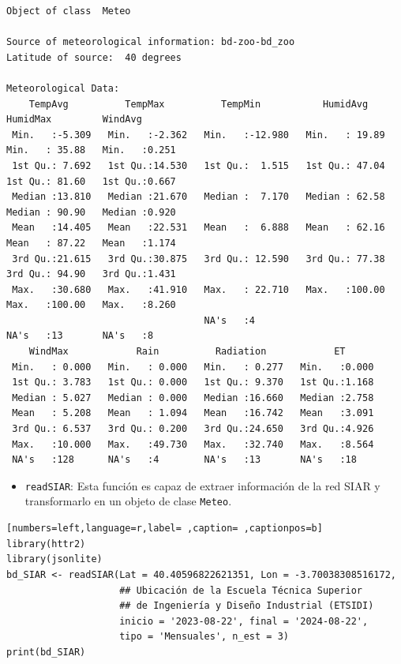 \begin{verbatim}
Object of class  Meteo 

Source of meteorological information: bd-zoo-bd_zoo 
Latitude of source:  40 degrees

Meteorological Data:
    TempAvg          TempMax          TempMin           HumidAvg         HumidMax         WindAvg     
 Min.   :-5.309   Min.   :-2.362   Min.   :-12.980   Min.   : 19.89   Min.   : 35.88   Min.   :0.251  
 1st Qu.: 7.692   1st Qu.:14.530   1st Qu.:  1.515   1st Qu.: 47.04   1st Qu.: 81.60   1st Qu.:0.667  
 Median :13.810   Median :21.670   Median :  7.170   Median : 62.58   Median : 90.90   Median :0.920  
 Mean   :14.405   Mean   :22.531   Mean   :  6.888   Mean   : 62.16   Mean   : 87.22   Mean   :1.174  
 3rd Qu.:21.615   3rd Qu.:30.875   3rd Qu.: 12.590   3rd Qu.: 77.38   3rd Qu.: 94.90   3rd Qu.:1.431  
 Max.   :30.680   Max.   :41.910   Max.   : 22.710   Max.   :100.00   Max.   :100.00   Max.   :8.260  
                                   NA's   :4                          NA's   :13       NA's   :8      
    WindMax            Rain          Radiation            ET       
 Min.   : 0.000   Min.   : 0.000   Min.   : 0.277   Min.   :0.000  
 1st Qu.: 3.783   1st Qu.: 0.000   1st Qu.: 9.370   1st Qu.:1.168  
 Median : 5.027   Median : 0.000   Median :16.660   Median :2.758  
 Mean   : 5.208   Mean   : 1.094   Mean   :16.742   Mean   :3.091  
 3rd Qu.: 6.537   3rd Qu.: 0.200   3rd Qu.:24.650   3rd Qu.:4.926  
 Max.   :10.000   Max.   :49.730   Max.   :32.740   Max.   :8.564  
 NA's   :128      NA's   :4        NA's   :13       NA's   :18
\end{verbatim}

\begin{itemize}
\item \texttt{readSIAR}: Esta función es capaz de extraer información de la red SIAR y transformarlo en un objeto de clase \texttt{Meteo}.
\end{itemize}
\begin{lstlisting}[numbers=left,language=r,label= ,caption= ,captionpos=b]
library(httr2)
library(jsonlite)
bd_SIAR <- readSIAR(Lat = 40.40596822621351, Lon = -3.70038308516172,
                    ## Ubicación de la Escuela Técnica Superior
                    ## de Ingeniería y Diseño Industrial (ETSIDI)
                    inicio = '2023-08-22', final = '2024-08-22',
                    tipo = 'Mensuales', n_est = 3)
print(bd_SIAR)
\end{lstlisting}


